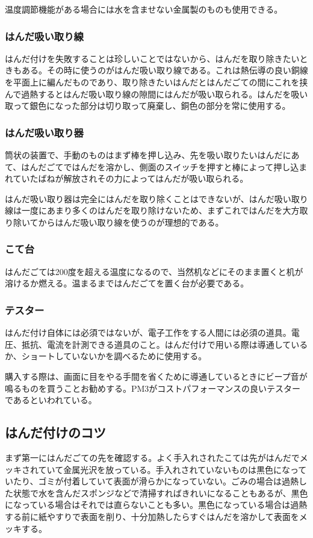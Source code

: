 \documentclass[a4paper,titlepage,here]{ujarticle}
\begin{document}
温度調節機能がある場合には水を含ませない金属製のものも使用できる。
\subsubsection{はんだ吸い取り線}
はんだ付けを失敗することは珍しいことではないから、はんだを取り除きたいときもある。その時に使うのがはんだ吸い取り線である。これは熱伝導の良い銅線を平面上に編んだものであり、取り除きたいはんだとはんだごての間にこれを挟んで過熱するとはんだ吸い取り線の隙間にはんだが吸い取られる。はんだを吸い取って銀色になった部分は切り取って廃棄し、銅色の部分を常に使用する。
\subsubsection{はんだ吸い取り器}
筒状の装置で、手動のものはまず棒を押し込み、先を吸い取りたいはんだにあて、はんだごてではんだを溶かし、側面のスイッチを押すと棒によって押し込まれていたばねが解放されその力によってはんだが吸い取られる。

はんだ吸い取り器は完全にはんだを取り除くことはできないが、はんだ吸い取り線は一度にあまり多くのはんだを取り除けないため、まずこれではんだを大方取り除いてからはんだ吸い取り線を使うのが理想的である。
\subsubsection{こて台}
はんだごては200度を超える温度になるので、当然机などにそのまま置くと机が溶けるか燃える。温まるまではんだごてを置く台が必要である。
\subsubsection{テスター}
はんだ付け自体には必須ではないが、電子工作をする人間には必須の道具。電圧、抵抗、電流を計測できる道具のこと。はんだ付けで用いる際は導通しているか、ショートしていないかを調べるために使用する。

購入する際は、画面に目をやる手間を省くために導通しているときにビープ音が鳴るものを買うことお勧めする。PM3がコストパフォーマンスの良いテスターであるといわれている。
\subsection{はんだ付けのコツ}
まず第一にはんだごての先を確認する。よく手入れされたこては先がはんだでメッキされていて金属光沢を放っている。手入れされていないものは黒色になっていたり、ゴミが付着していて表面が滑らかになっていない。ごみの場合は過熱した状態で水を含んだスポンジなどで清掃すればきれいになることもあるが、黒色になっている場合はそれでは直らないことも多い。黒色になっている場合は過熱する前に紙やすりで表面を削り、十分加熱したらすぐはんだを溶かして表面をメッキする。
\end{document}
